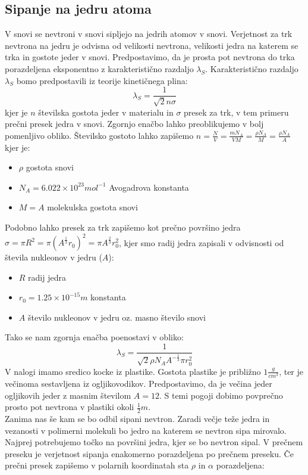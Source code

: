 \documentclass[slovene,11pt,a4paper]{article}
\numberwithin{equation}{section} %
\numberwithin{figure}{section} %
\numberwithin{table}{section} %
\begin{document}
\subsection{Sipanje na jedru atoma} \label{sipanje-na-jedru}
V snovi se nevtroni v snovi sipljejo na jedrih atomov v snovi. Verjetnost za trk nevtrona na jedru je odvisna od velikosti nevtrona, velikosti jedra na katerem se trka in gostote jeder v snovi. Predpostavimo, da je prosta pot nevtrona do trka porazdeljena eksponentno z karakteristično razdaljo $\lambda_S$. Karakteristično razdaljo $\lambda_S$ bomo predpostavili iz teorije kinetičnega plina:
\begin{equation}
\lambda_S = \frac{1}{\sqrt{2} n \sigma}
\end{equation}
kjer je $n$ številska gostota jeder v materialu in $\sigma$ presek za trk, v tem primeru prečni presek jedra v snovi. Zgornjo enačbo lahko preoblikujemo v bolj pomenljivo obliko. Številsko gostoto lahko zapišemo $n=\frac{N}{V}=\frac{m N_A}{V M}=\frac{\rho N_A}{M}=\frac{\rho N_A}{A}$
kjer je:
\begin{itemize}
\item $\rho$ gostota snovi
\item $N_A=6.022 \times 10^{23}mol^{-1}$ Avogadrova konstanta
\item $M=A$ molekulska gostota snovi
\end{itemize}
Podobno lahko presek za trk zapišemo kot prečno površino jedra $\sigma=\pi R^2=\pi (A^{\frac{1}{3}}r_0)^2=\pi A^{\frac{2}{3}} r_0^2$, kjer smo radij jedra zapisali v odvisnosti od števila nukleonov v jedru ($A$):
\begin{itemize}
\item $R$ radij jedra
\item $r_0=1.25\times 10^{-15}m$ konstanta 
\item $A$ število nukleonov v jedru oz. masno število snovi
\end{itemize}
Tako se nam zgornja enačba poenostavi v obliko:
\begin{equation}
\lambda_S = \frac{1}{\sqrt{2} \rho N_A A^{- \frac{1}{3}} \pi r_0^2}
\end{equation}
V nalogi imamo sredico kocke iz plastike. Gostota plastike je približno $1\frac{g}{cm^3}$, ter je večinoma sestavljena iz ogljikovodikov. Predpostavimo, da je večina jeder ogljikovih jeder z masnim številom $A=12$. S temi pogoji dobimo povprečno prosto pot nevtrona v plastiki okoli $\frac{1}{2}m$.\\
Zanima nas še kam se bo odbil sipani nevtron. Zaradi večje teže jedra in vezanosti v polimerni molekuli bo jedro na katerem se nevtron sipa mirovalo. Najprej potrebujemo točko na površini jedra, kjer se bo nevtron sipal. V prečnem preseku je verjetnost sipanja enakomerno porazdeljena po prečnem preseku. Če prečni presek zapišemo v polarnih koordinatah sta $\rho$ in $\alpha$ porazdeljena:
\end{document}
